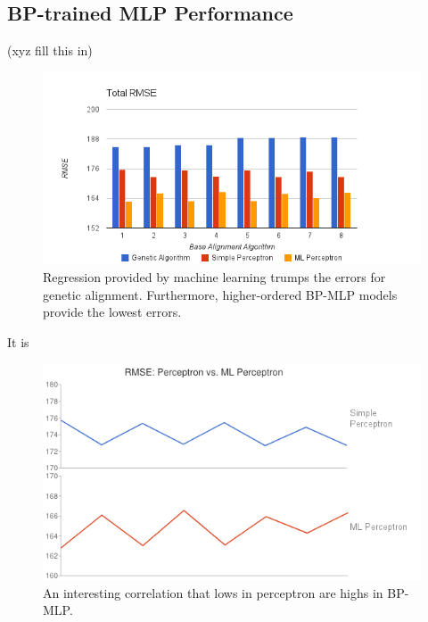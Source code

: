 
\clearpage

\subsection{BP-trained MLP Performance}
(xyz fill this in)

\begin{figure}[center]
	\centering
	\includegraphics[width=16cm]{images/chart4.png}
	\caption{Regression provided by machine learning trumps the errors for genetic alignment. Furthermore, higher-ordered BP-MLP models provide the lowest errors.}
	\label{fig:overall_ml}
\end{figure}

It is 
\begin{figure}[center]
	\centering
	\includegraphics[width=12cm]{images/chart10.png}
	\caption{An interesting correlation that lows in perceptron are highs in BP-MLP.}
	\label{fig:perceptron_vs_bp}
\end{figure}
\clearpage

